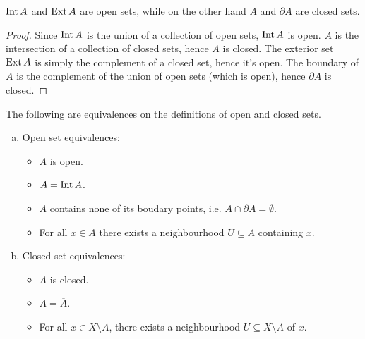 \begin{proposition}\label{prop:open-close-int-ext-closure-boundary}
\(\operatorname{Int} A\) and \(\operatorname{Ext} A\) are open sets, while on the other hand \(\overline A\)
and \(\partial A\) are closed sets.
\end{proposition}

\begin{proof}
Since \(\operatorname{Int} A\) is the union of a collection of open sets, \(\operatorname{Int} A\) is
open. \(\overline{A}\) is the intersection of a collection of closed sets, hence
\(\overline{A}\) is closed. The exterior set \(\operatorname{Ext} A\) is simply the complement
of a closed set, hence it's open. The boundary of \(A\) is the complement of the
union of open sets (which is open), hence \(\partial A\) is closed.
\end{proof}

\begin{proposition}
\label{prop:equiv-open-and-closed-set}
The following are equivalences on the definitions of open and closed sets.
\begin{enumerate}[(a)]\setlength\itemsep{0em}
\item Open set equivalences:
  \begin{itemize}\setlength\itemsep{0em}
    \item \(A\) is open.

    \item \(A = \operatorname{Int} A\).

    \item \(A\) contains none of its boudary points, i.e. \(A \cap \partial A =
      \emptyset\).

    \item For all \(x \in A\) there exists a neighbourhood \(U \subseteq A\)
      containing \(x\).
  \end{itemize}

\item Closed set equivalences:
  \begin{itemize}\setlength\itemsep{0em}
    \item \(A\) is closed.

    \item \(A = \overline{A}\).

    \item For all \(x \in X \setminus A\), there exists a neighbourhood \(U
      \subseteq X \setminus A\) of \(x\).
  \end{itemize}
\end{enumerate}
\end{proposition}

